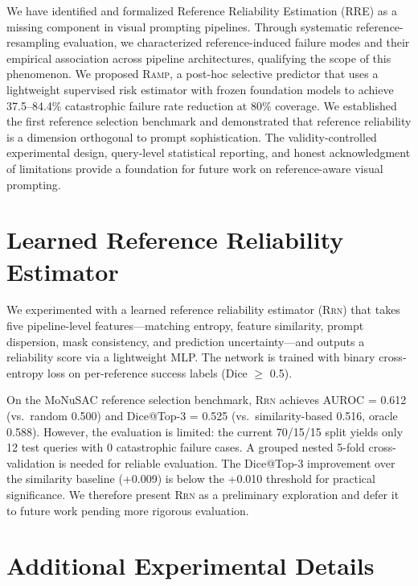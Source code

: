 \documentclass[11pt]{article}
\newcommand{\RAMP}{\textsc{Ramp}}
\begin{document}
We have identified and formalized Reference Reliability Estimation (RRE) as
a missing component in visual prompting pipelines. Through systematic
reference-resampling evaluation, we characterized reference-induced
failure modes and their empirical association across pipeline architectures,
qualifying the scope of this phenomenon. We proposed \RAMP{}, a post-hoc
selective predictor that uses a lightweight supervised risk estimator with
frozen foundation models to achieve 37.5--84.4\% catastrophic failure rate
reduction at 80\% coverage. We established the first reference selection
benchmark and demonstrated that reference reliability is a dimension
orthogonal to prompt sophistication. The validity-controlled experimental
design, query-level statistical reporting, and honest acknowledgment of
limitations provide a foundation for future work on reference-aware visual
prompting.

\appendix

\section{Learned Reference Reliability Estimator}
\label{sec:rrn}

We experimented with a learned reference reliability estimator (\textsc{Rrn})
that takes five pipeline-level features---matching entropy, feature
similarity, prompt dispersion, mask consistency, and prediction
uncertainty---and outputs a reliability score via a lightweight MLP. The
network is trained with binary cross-entropy loss on per-reference success
labels (Dice $\geq$ 0.5).

On the MoNuSAC reference selection benchmark, \textsc{Rrn} achieves AUROC =
0.612 (vs.\ random 0.500) and Dice@Top-3 = 0.525 (vs.\ similarity-based
0.516, oracle 0.588). However, the evaluation is limited: the current
70/15/15 split yields only 12 test queries with 0 catastrophic failure
cases. A grouped nested 5-fold cross-validation is needed for reliable
evaluation. The Dice@Top-3 improvement over the similarity baseline (+0.009)
is below the +0.010 threshold for practical significance. We therefore
present \textsc{Rrn} as a preliminary exploration and defer it to future
work pending more rigorous evaluation.

\section{Additional Experimental Details}
\end{document}
